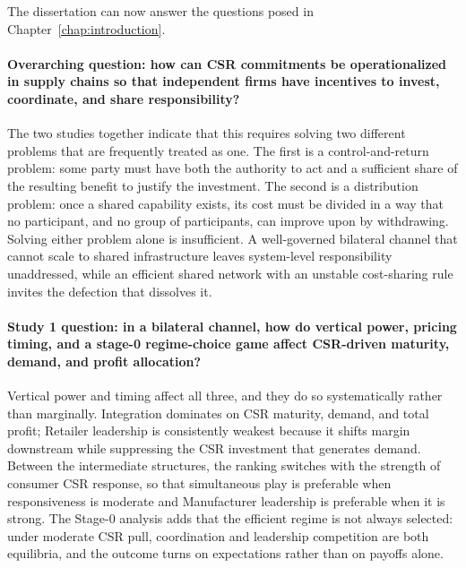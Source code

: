 The dissertation can now answer the questions posed in Chapter~\ref{chap:introduction}.

\paragraph{Overarching question: how can CSR commitments be operationalized in supply chains so that independent firms have incentives to invest, coordinate, and share responsibility?}
The two studies together indicate that this requires solving two different problems that are frequently treated as one. The first is a control-and-return problem: some party must have both the authority to act and a sufficient share of the resulting benefit to justify the investment. The second is a distribution problem: once a shared capability exists, its cost must be divided in a way that no participant, and no group of participants, can improve upon by withdrawing. Solving either problem alone is insufficient. A well-governed bilateral channel that cannot scale to shared infrastructure leaves system-level responsibility unaddressed, while an efficient shared network with an unstable cost-sharing rule invites the defection that dissolves it.

\paragraph{Study 1 question: in a bilateral channel, how do vertical power, pricing timing, and a stage-0 regime-choice game affect CSR-driven maturity, demand, and profit allocation?}
Vertical power and timing affect all three, and they do so systematically rather than marginally. Integration dominates on CSR maturity, demand, and total profit; Retailer leadership is consistently weakest because it shifts margin downstream while suppressing the CSR investment that generates demand. Between the intermediate structures, the ranking switches with the strength of consumer CSR response, so that simultaneous play is preferable when responsiveness is moderate and Manufacturer leadership is preferable when it is strong. The Stage-0 analysis adds that the efficient regime is not always selected: under moderate CSR pull, coordination and leadership competition are both equilibria, and the outcome turns on expectations rather than on payoffs alone.

